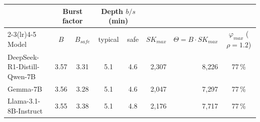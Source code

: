 \begin{tabular}{lccccrrc}
\toprule
 & \multicolumn{2}{c}{Burst factor} & \multicolumn{2}{c}{Depth $b/s$ (min)} & & & \\
\cmidrule(lr){2-3}\cmidrule(lr){4-5}
Model & $B$ & $B_{safe}$ & typical & safe & $SK_{max}$ & $\Theta = B \cdot SK_{max}$ & $\varphi_{max}$ ($\rho=1.2$) \\
\midrule
DeepSeek-R1-Distill-Qwen-7B & 3.57 & 3.31 & 5.1 & 4.6 & 2{,}307 & 8{,}226 & 77\,\% \\
Gemma-7B & 3.56 & 3.28 & 5.1 & 4.6 & 2{,}047 & 7{,}297 & 77\,\% \\
Llama-3.1-8B-Instruct & 3.55 & 3.38 & 5.1 & 4.8 & 2{,}176 & 7{,}717 & 77\,\% \\
\bottomrule
\end{tabular}
